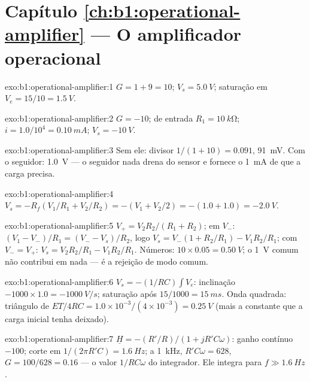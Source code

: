 \section*{Capítulo \ref{ch:b1:operational-amplifier} --- O amplificador operacional}

\begin{solution}{exo:b1:operational-amplifier:1}
$G = 1 + 9 = 10$; $V_s = \qty{5.0}{V}$; saturação em $V_e = 15/10 =
\qty{1.5}{V}$.
\end{solution}

\begin{solution}{exo:b1:operational-amplifier:2}
$G = -10$;  de entrada $R_1 = \qty{10}{k\ohm}$; $i = 1.0/10^4 =
\qty{0.10}{mA}$; $V_s = \qty{-10}{V}$.
\end{solution}

\begin{solution}{exo:b1:operational-amplifier:3}
Sem ele: divisor $1/(1 + 10) = 0.091$, \qty{91}{mV}. Com o seguidor:
\qty{1.0}{V} --- o seguidor nada drena do sensor e fornece
o \qty{1}{mA} de que a carga precisa.
\end{solution}

\begin{solution}{exo:b1:operational-amplifier:4}
$V_s = -R_f(V_1/R_1 + V_2/R_2) = -(V_1 + V_2/2) = -(1.0 + 1.0) = \qty{-2.0}{V}$.
\end{solution}

\begin{solution}{exo:b1:operational-amplifier:5}
$V_+ = V_2R_2/(R_1 + R_2)$; em $V_-$: $(V_1 - V_-)/R_1 = (V_- - V_s)/R_2$,
logo $V_s = V_-(1 + R_2/R_1) - V_1R_2/R_1$; com $V_- = V_+$:
$V_s = V_2R_2/R_1 - V_1R_2/R_1$. Números: $10 \times 0.05 = \qty{0.50}{V}$;
o \qty{1}{V} comum não contribui em nada --- é a rejeição de modo comum.
\end{solution}

\begin{solution}{exo:b1:operational-amplifier:6}
$V_s = -(1/RC)\int V_e$: inclinação $-1000 \times 1.0 = \qty{-1000}{V/s}$;
saturação após $15/1000 = \qty{15}{ms}$. Onda quadrada: triângulo de
 $ET/4RC = 1.0 \times 10^{-3}/(4 \times 10^{-3}) = \qty{0.25}{V}$
(mais a constante que a carga inicial tenha deixado).
\end{solution}

\begin{solution}{exo:b1:operational-amplifier:7}
$\underline H = -(R'/R)/(1 + jR'C\omega)$: ganho contínuo $-100$; corte em
$1/(2\pi R'C) = \qty{1.6}{Hz}$; a \qty{1}{kHz}, $R'C\omega = 628$, $G =
100/628 = 0.16$ --- o valor $1/RC\omega$ do integrador. Ele integra para
$f \gg \qty{1.6}{Hz}$.
\end{solution}

